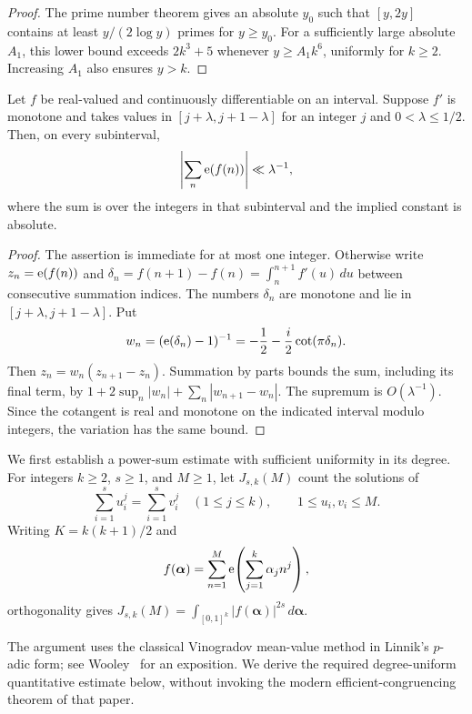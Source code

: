 \begin{proof}
The prime number theorem gives an absolute $y_0$ such that
$[y,2y]$ contains at least $y/(2\log y)$ primes for $y\ge y_0$.
For a sufficiently large absolute $A_1$, this lower bound exceeds
$2k^3+5$ whenever $y\ge A_1k^6$, uniformly for $k\ge2$.
Increasing $A_1$ also ensures $y>k$.
\end{proof}

\begin{lemma}\label{lp:pre-derivatives}
Let $f$ be real-valued and continuously differentiable on an interval. Suppose $f'$
is monotone and takes values in $[j+\lambda,j+1-\lambda]$ for an
integer $j$ and $0<\lambda\le1/2$. Then, on every subinterval,
\[
 \left|\sum_n\mathrm{e}(f(n))\right|\ll\lambda^{-1},
\]
where the sum is over the integers in that subinterval and the
implied constant is absolute.
\end{lemma}

\begin{proof}
The assertion is immediate for at most one integer. Otherwise write
$z_n=\mathrm{e}(f(n))$ and
$\delta_n=f(n+1)-f(n)=\int_n^{n+1}f'(u)\,du$
between consecutive summation indices. The numbers $\delta_n$ are
monotone and lie in $[j+\lambda,j+1-\lambda]$. Put
\[
 w_n=(\mathrm{e}(\delta_n)-1)^{-1}
     =-\frac12-\frac i2\cot(\pi\delta_n).
\]
Then $z_n=w_n(z_{n+1}-z_n)$. Summation by parts bounds the sum,
including its final term, by
$1+2\sup_n|w_n|+\sum_n|w_{n+1}-w_n|$.
The supremum is $O(\lambda^{-1})$. Since the cotangent is real
and monotone on the indicated interval modulo integers, the
variation has the same bound.
\end{proof}


We first establish a power-sum estimate with sufficient uniformity in its
degree.  For integers $k\ge2$, $s\ge1$, and $M\ge1$, let $J_{s,k}(M)$ count
the solutions of
\[
 \sum_{i=1}^s u_i^j=\sum_{i=1}^s v_i^j
 \quad(1\le j\le k),\qquad 1\le u_i,v_i\le M.
\]
Writing $K=k(k+1)/2$ and
\[
 f(\boldsymbol\alpha)=\sum_{n=1}^M
       \mathrm{e}\!\left(\sum_{j=1}^k\alpha_j n^j\right),
\]
orthogonality gives
$J_{s,k}(M)=\int_{[0,1]^k}|f(\boldsymbol\alpha)|^{2s}
\,d\boldsymbol\alpha$.

The argument uses the classical Vinogradov mean-value method in
Linnik's $p$-adic form; see Wooley~\cite[Section~2, pp.~1583--1585]{Wooley2012}
for an exposition.  We derive the required degree-uniform quantitative
estimate below, without invoking the modern efficient-congruencing
theorem of that paper.

